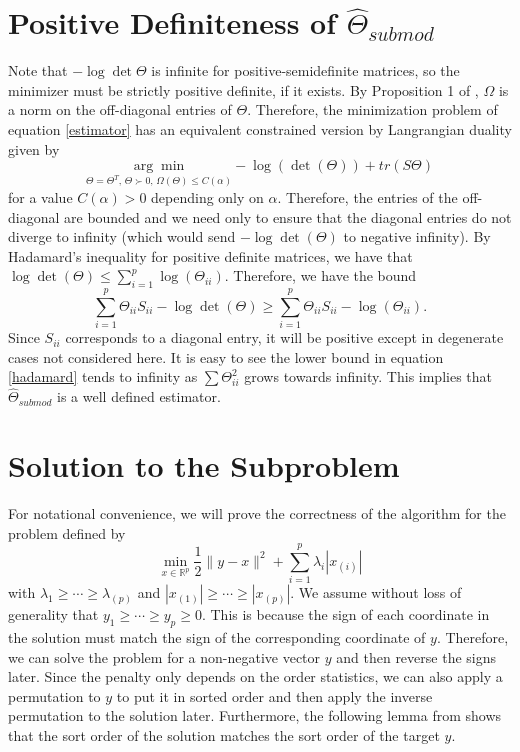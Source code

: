 \documentclass{uwstat572}
\theoremstyle{remark}
\theoremstyle{definition}
\begin{document}
\section{Positive Definiteness of $\hat{\Theta}_{submod}$}

 Note that $- \log \det \Theta$ is infinite for positive-semidefinite matrices, so the minimizer must be strictly positive definite, if it exists.  By Proposition 1 of \cite{bach2010}, $\Omega$ is a norm on the off-diagonal entries of $\Theta$.  Therefore, the minimization problem of equation \eqref{estimator} has an equivalent constrained version by Langrangian duality given by
\begin{equation}
\underset{\Theta = \Theta^T, \, \Theta \succ 0, \, \Omega(\Theta) \leq C(\alpha)}{\arg \min} - \log(\det(\Theta)) + tr(S \Theta)
\end{equation}
for a value $C(\alpha) > 0$ depending only on $\alpha$. Therefore, the entries of the off-diagonal are bounded and we need only to ensure that the diagonal entries do not diverge to infinity (which would send $- \log \det (\Theta)$ to negative infinity).  By Hadamard's inequality for positive definite matrices, we have that $\log \det (\Theta) \leq \sum_{i=1}^p \log (\Theta_{ii})$.  Therefore, we have the bound
\begin{equation}\label{hadamard}
\sum_{i=1}^p \Theta_{ii} S_{ii} - \log \det (\Theta) \geq \sum_{i=1}^p\Theta_{ii} S_{ii} - \log (\Theta_{ii}).
\end{equation}
Since $S_{ii}$ corresponds to a diagonal entry, it will be positive except in degenerate cases not considered here.  It is easy to see the lower bound in equation \eqref{hadamard} tends to infinity as $\sum \Theta_{ii}^2$ grows towards infinity.  This implies that $\widehat{\Theta}_{submod}$ is a well defined estimator.



\section{Solution to the Subproblem}

For notational convenience, we will prove the correctness of the algorithm for the problem defined by
\begin{equation}\label{subprobsimple}
\min_{x \in \mathbb{R}^p} \frac{1}{2} \|y - x\|^2 + \sum_{i=1}^p \lambda_{i} |x_{(i)}|
\end{equation}
with $\lambda_{1} \geq \cdots \geq \lambda_{(p)}$ and $|x_{(1)}| \geq \cdots \geq |x_{(p)}|$.  We assume without loss of generality that $y_{1} \geq \cdots \geq y_{p} \geq 0$.  This is because the sign of each coordinate in the solution must match the sign of the corresponding coordinate of $y$.  Therefore, we can solve the problem for a non-negative vector $y$ and then reverse the signs later.  Since the penalty only depends on the order statistics, we can also apply a permutation to $y$ to put it in sorted order and then apply the inverse permutation to the solution later.  Furthermore, the following lemma from \cite{bogdan2015slope} shows that the sort order of the solution matches the sort order of the target $y$.
\end{document}

